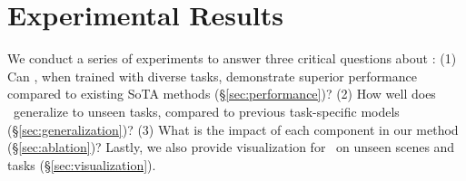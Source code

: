 


\begin{table*}[t]
\centering
\renewcommand\arraystretch{1}
\caption{Detail comparison with state-of-the-art methods on ScanQA.}
\label{table:scanqa_sota}
\end{table*}








\section{Experimental Results}
\label{sec:experiments}
We conduct a series of experiments to answer three critical questions about \modelname: 
(1) Can \modelname, when trained with diverse tasks, demonstrate superior performance compared to existing SoTA methods (\S \ref{sec:performance})?
(2) How well does \modelname~generalize to unseen tasks, compared to previous task-specific models (\S \ref{sec:generalization})?
(3) What is the impact of each component in our method (\S \ref{sec:ablation})?
Lastly, we also provide visualization for \modelname~on unseen scenes and tasks (\S \ref{sec:visualization}).







